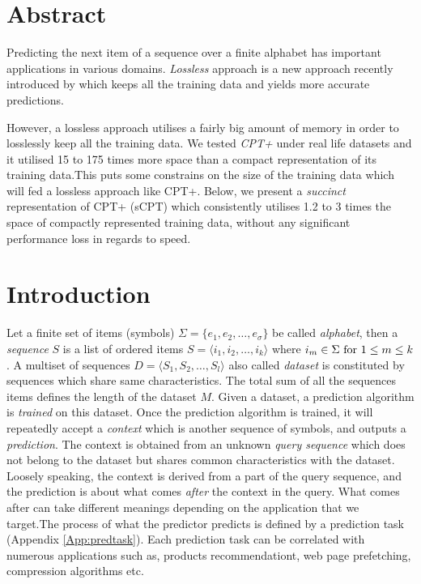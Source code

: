 \begin{comment}
							

\end{comment}

\section*{Abstract}
Predicting the next item of a sequence over a finite alphabet has important applications in various domains. \emph{Lossless} approach is a new approach  recently introduced by \citeauthor{gueniche_fournier-viger_tseng_2013} \cite{gueniche_fournier-viger_tseng_2013} which keeps all the training data and yields more accurate predictions. 
\par However, a lossless approach utilises a fairly big amount of memory in order to losslessly keep all the training data. We tested \emph{CPT+} \cite{gueniche_fournier-viger_raman_tseng_2015} under real life datasets and it utilised 15 to 175 times more space than a compact representation of its training data.This puts some constrains on the size of the training data which will fed a lossless approach like CPT+. Below, we present a \emph{succinct} representation of CPT+ (sCPT) which consistently utilises 1.2 to 3  times the space of compactly represented training data, without any significant performance loss in regards to speed.


\section{Introduction}
Let a finite set of items (symbols) \(\Sigma = \{e_1, e_2,\ldots,e_\sigma\}\) be called \emph{alphabet}, then a \emph{sequence} \(S\) is a list of ordered items \(S=\langle i_1,i_2,\ldots,i_k\rangle\) where \(i_m \in \Sigma\ \textnormal{for} \ 1\leq m \leq k\). A multiset of sequences \(D = \langle S_1, S_2,\ldots,S_l\rangle\) also called \emph{dataset} is constituted by sequences which share same characteristics. The total sum of all the sequences items defines the length of the dataset $M$. Given a dataset, a prediction algorithm is \emph{trained} on this dataset.  Once the prediction algorithm is trained, it will repeatedly accept a \emph{context} which is another sequence of symbols, and outputs a \emph{prediction}. The context is obtained from an unknown \emph{query sequence} which does not belong to the dataset but shares common characteristics with the dataset.  Loosely speaking, the context is derived from a part of the query sequence, and the prediction is about what comes \emph{after} the context in the query. What comes after can take different meanings depending on the application that we target.The process of what the predictor predicts is defined by a prediction task (Appendix \ref{App:predtask}). Each prediction task can be correlated with numerous applications such as, products recommendationt, web page prefetching, compression algorithms etc. 

